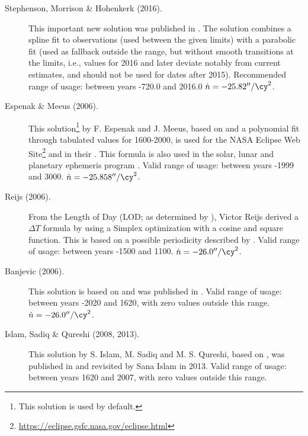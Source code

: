 \begin{description}
\item[Stephenson, Morrison \& Hohenkerk (2016).] This important new solution was published 
  in . 
  The solution combines a spline fit to observations (used between the given limits) 
  with a parabolic fit (used as fallback outside the range, but without smooth transitions at the limits, i.e., 
  values for 2016 and later deviate notably from current estimates, and should not be used for dates after 2015).
  Recommended range of usage: between years -720.0 and 2016.0 $\dot{n}=-25.82''/\cy^2$.
  
\item[Espenak \& Meeus (2006).] This solution\footnote{This solution
    is used by default.} by F. Espenak and J. Meeus, based on 
	\citet{2004JHA....35..327M} and a polynomial fit
  through tabulated values for 1600-2000, is used for the NASA Eclipse
  Web Site\footnote{\url{https://eclipse.gsfc.nasa.gov/eclipse.html}}
  and in their . This formula is also used in the
  solar, lunar and planetary ephemeris program . Valid
  range of usage: between years -1999 and
  3000. $\dot{n}=-25.858''/\cy^2$.

\item[Reijs (2006).] From the Length of Day (LOD; as determined by
  \citet{2004JHA....35..327M}), Victor Reijs
  derived a $\Delta T$ formula by using a Simplex optimization with a
  cosine and square
  function.
  This is based on a possible periodicity described by
  \citet{2004JHA....35..327M}. Valid range of usage: between
  years -1500 and 1100. $\dot{n}=-26.0''/\cy^2$.

\item[Banjevic (2006).] This solution is based on
  \citet{1984RSPTA.313...47S} and was
  published in . Valid range of usage: between
  years -2020 and 1620, with zero values outside this range. 
  $\dot{n}=-26.0''/\cy^2$.

\item[Islam, Sadiq \& Qureshi (2008, 2013).] This solution by
  S. Islam, M. Sadiq and M. S. Qureshi, based on \citet{2000JBAA..110..323M}, was published in 
   and revisited by Sana Islam
  in 2013. Valid range of usage: between years 1620 and 2007, with
  zero values outside this range.


\end{description}
